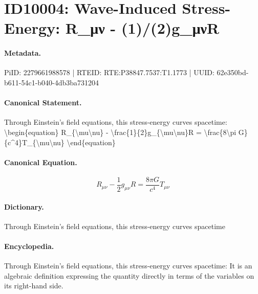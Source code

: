 \section*{ID10004: Wave-Induced Stress-Energy: R\_μν - (1)/(2)g\_μνR}
\paragraph{Metadata.}
PiID: 2279661988578 | RTEID: RTE:P38847.7537:T1.1773 | UUID: 62e350bd-b611-54c1-b040-4db3ba731204

\paragraph{Canonical Statement.}
Through Einstein's field equations, this stress-energy curves spacetime: \textbackslash{}begin\{equation\} R\_\{\textbackslash{}mu\textbackslash{}nu\} - \textbackslash{}frac\{1\}\{2\}g\_\{\textbackslash{}mu\textbackslash{}nu\}R = \textbackslash{}frac\{8\textbackslash{}pi G\}\{c\textasciicircum{}4\}T\_\{\textbackslash{}mu\textbackslash{}nu\} \textbackslash{}end\{equation\}

\paragraph{Canonical Equation.}
\[
R_{\mu\nu} - \frac{1}{2}g_{\mu\nu}R = \frac{8\pi G}{c^4}T_{\mu\nu}
\]

\paragraph{Dictionary.}
Through Einstein's field equations, this stress-energy curves spacetime

\paragraph{Encyclopedia.}
Through Einstein's field equations, this stress-energy curves spacetime: It is an algebraic definition expressing the quantity directly in terms of the variables on its right-hand side.
